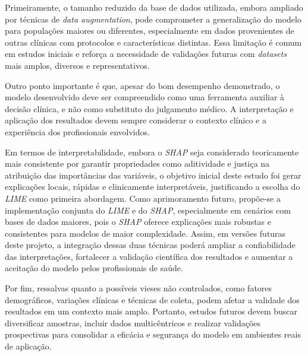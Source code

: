 Primeiramente, o tamanho reduzido da base de dados utilizada, embora ampliado por técnicas de \textit{data augmentation}, pode comprometer a generalização do modelo para populações maiores ou diferentes, especialmente em dados provenientes de outras clínicas com protocolos e características distintas. Essa limitação é comum em estudos iniciais e reforça a necessidade de validações futuras com \textit{datasets} mais amplos, diversos e representativos.

Outro ponto importante é que, apesar do bom desempenho demonstrado, o modelo desenvolvido deve ser compreendido como uma ferramenta auxiliar à decisão clínica, e não como substituto do julgamento médico. A interpretação e aplicação dos resultados devem sempre considerar o contexto clínico e a experiência dos profissionais envolvidos.

Em termos de interpretabilidade, embora o \textit{SHAP} seja considerado teoricamente mais consistente por garantir propriedades como aditividade e justiça na atribuição das importâncias das variáveis, o objetivo inicial deste estudo foi gerar explicações locais, rápidas e clinicamente interpretáveis, justificando a escolha do \textit{LIME} como primeira abordagem. Como aprimoramento futuro, propõe-se a implementação conjunta do \textit{LIME} e do \textit{SHAP}, especialmente em cenários com bases de dados maiores, pois o \textit{SHAP} oferece explicações mais robustas e consistentes para modelos de maior complexidade. Assim, em versões futuras deste projeto, a integração dessas duas técnicas poderá ampliar a confiabilidade das interpretações, fortalecer a validação científica dos resultados e aumentar a aceitação do modelo pelos profissionais de saúde.

Por fim, ressalvas quanto a possíveis vieses não controlados, como fatores demográficos, variações clínicas e técnicas de coleta, podem afetar a validade dos resultados em um contexto mais amplo. Portanto, estudos futuros devem buscar diversificar amostras, incluir dados multicêntricos e realizar validações prospectivas para consolidar a eficácia e segurança do modelo em ambientes reais de aplicação.
